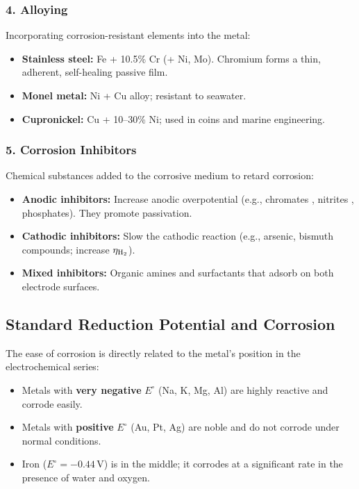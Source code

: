 \subsubsection{4. Alloying}

Incorporating corrosion-resistant elements into the metal:
\begin{itemize}
    \item \textbf{Stainless steel:} Fe + 10.5\% Cr (+ Ni, Mo). Chromium forms a thin, adherent, self-healing  passive film.
    \item \textbf{Monel metal:} Ni + Cu alloy; resistant to seawater.
    \item \textbf{Cupronickel:} Cu + 10--30\% Ni; used in coins and marine engineering.
\end{itemize}

\subsubsection{5. Corrosion Inhibitors}

Chemical substances added to the corrosive medium to retard corrosion:
\begin{itemize}
    \item \textbf{Anodic inhibitors:} Increase anodic overpotential (e.g., chromates , nitrites , phosphates). They promote passivation.
    \item \textbf{Cathodic inhibitors:} Slow the cathodic reaction (e.g., arsenic, bismuth compounds; increase $\eta_{\ce{H2}}$).
    \item \textbf{Mixed inhibitors:} Organic amines and surfactants that adsorb on both electrode surfaces.
\end{itemize}

\subsection{Standard Reduction Potential and Corrosion}

The ease of corrosion is directly related to the metal's position in the electrochemical series:
\begin{itemize}
    \item Metals with \textbf{very negative} $E^\circ$ (Na, K, Mg, Al) are highly reactive and corrode easily.
    \item Metals with \textbf{positive} $E^\circ$ (Au, Pt, Ag) are noble and do not corrode under normal conditions.
    \item Iron ($E^\circ = -0.44\,\text{V}$) is in the middle; it corrodes at a significant rate in the presence of water and oxygen.
\end{itemize}

